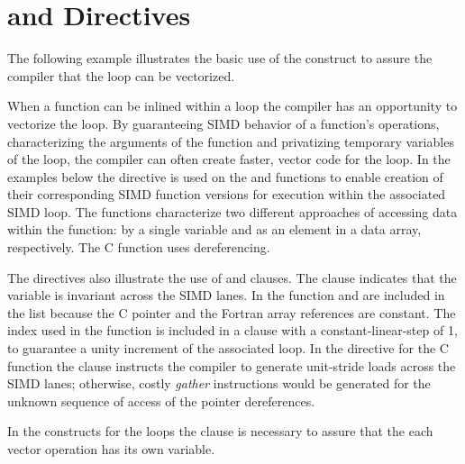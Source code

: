 \section{ and   Directives}
\label{sec:SIMD}

The following example illustrates the basic use of the  construct 
to assure the compiler that the loop can be vectorized.


 

When a function can be inlined within a loop the compiler has an opportunity to 
vectorize the loop. By guaranteeing SIMD behavior of a function's operations, 
characterizing the arguments of the function and privatizing temporary 
variables of the loop, the compiler can often create faster, vector code for 
the loop. In the examples below the   directive is 
used on the  and  functions to enable creation of their 
corresponding SIMD function versions for execution within the associated SIMD 
loop. The functions characterize two different approaches of accessing data 
within the function: by a single variable and as an element in a data array, 
respectively. The  C function uses dereferencing.

The   directives also illustrate the use of 
 and  clauses.  The  clause 
indicates that the variable  is invariant across the SIMD lanes. In 
the  function  and  are included in the  
list because the C pointer and the Fortran array references are constant.  The 
 index used in the  function is included in a  
clause with a constant-linear-step of 1, to guarantee a unity increment of the 
associated loop. In the   directive for the  
C function the   clause instructs the compiler to generate 
unit-stride loads across the SIMD lanes; otherwise,  costly \emph{gather} 
instructions would be generated for the unknown sequence of access of the 
pointer dereferences.

In the  constructs for the loops the  clause is 
necessary to assure that the each vector operation has its own  
variable.



